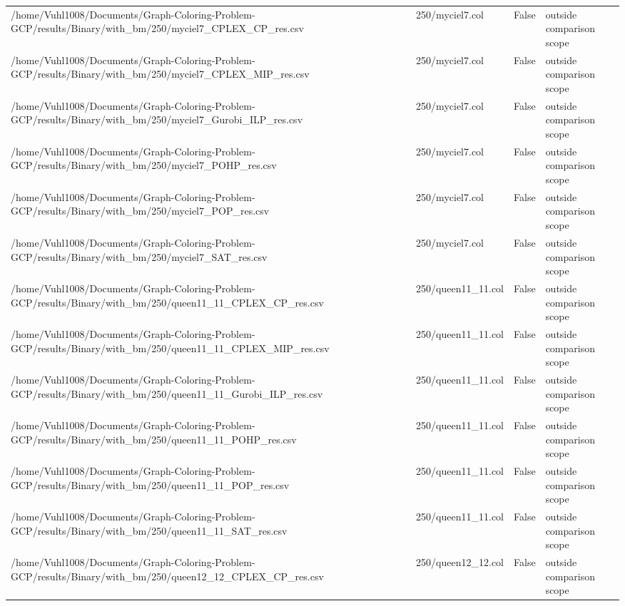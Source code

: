 \begin{table}[htbp]
\begin{tabular}{llll}
/home/Vuhl1008/Documents/Graph-Coloring-Problem-GCP/results/Binary/with\_bm/250/myciel7\_CPLEX\_CP\_res.csv & 250/myciel7.col & False & outside comparison scope \\
/home/Vuhl1008/Documents/Graph-Coloring-Problem-GCP/results/Binary/with\_bm/250/myciel7\_CPLEX\_MIP\_res.csv & 250/myciel7.col & False & outside comparison scope \\
/home/Vuhl1008/Documents/Graph-Coloring-Problem-GCP/results/Binary/with\_bm/250/myciel7\_Gurobi\_ILP\_res.csv & 250/myciel7.col & False & outside comparison scope \\
/home/Vuhl1008/Documents/Graph-Coloring-Problem-GCP/results/Binary/with\_bm/250/myciel7\_POHP\_res.csv & 250/myciel7.col & False & outside comparison scope \\
/home/Vuhl1008/Documents/Graph-Coloring-Problem-GCP/results/Binary/with\_bm/250/myciel7\_POP\_res.csv & 250/myciel7.col & False & outside comparison scope \\
/home/Vuhl1008/Documents/Graph-Coloring-Problem-GCP/results/Binary/with\_bm/250/myciel7\_SAT\_res.csv & 250/myciel7.col & False & outside comparison scope \\
/home/Vuhl1008/Documents/Graph-Coloring-Problem-GCP/results/Binary/with\_bm/250/queen11\_11\_CPLEX\_CP\_res.csv & 250/queen11\_11.col & False & outside comparison scope \\
/home/Vuhl1008/Documents/Graph-Coloring-Problem-GCP/results/Binary/with\_bm/250/queen11\_11\_CPLEX\_MIP\_res.csv & 250/queen11\_11.col & False & outside comparison scope \\
/home/Vuhl1008/Documents/Graph-Coloring-Problem-GCP/results/Binary/with\_bm/250/queen11\_11\_Gurobi\_ILP\_res.csv & 250/queen11\_11.col & False & outside comparison scope \\
/home/Vuhl1008/Documents/Graph-Coloring-Problem-GCP/results/Binary/with\_bm/250/queen11\_11\_POHP\_res.csv & 250/queen11\_11.col & False & outside comparison scope \\
/home/Vuhl1008/Documents/Graph-Coloring-Problem-GCP/results/Binary/with\_bm/250/queen11\_11\_POP\_res.csv & 250/queen11\_11.col & False & outside comparison scope \\
/home/Vuhl1008/Documents/Graph-Coloring-Problem-GCP/results/Binary/with\_bm/250/queen11\_11\_SAT\_res.csv & 250/queen11\_11.col & False & outside comparison scope \\
/home/Vuhl1008/Documents/Graph-Coloring-Problem-GCP/results/Binary/with\_bm/250/queen12\_12\_CPLEX\_CP\_res.csv & 250/queen12\_12.col & False & outside comparison scope \\

\end{tabular}
\end{table}
